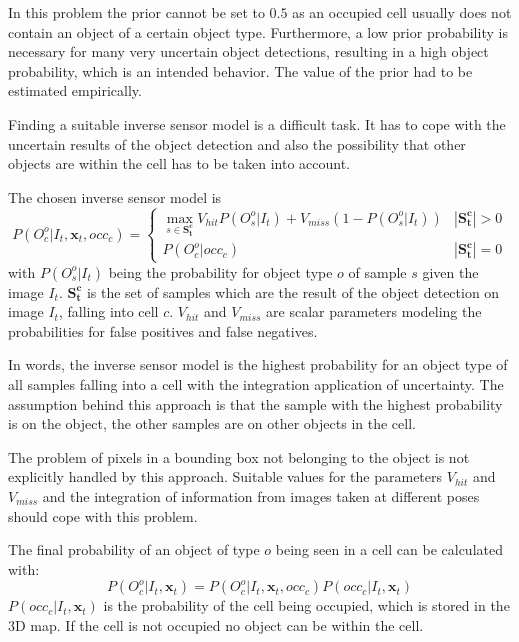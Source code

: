 In this problem the prior cannot be set to $0.5$ as an occupied cell usually does not contain an object of a certain object type. Furthermore, a low prior probability is necessary for many very uncertain object detections, resulting in a high object probability, which is an intended behavior. The value of the prior had to be estimated empirically.

Finding a suitable inverse sensor model is a difficult task. It has to cope with the uncertain results of the object detection and also the possibility that other objects are within the cell has to be taken into account.

The chosen inverse sensor model is
\begin{equation}
 P(O_{c}^{o}|I_{t}, \mathbf{x}_{t},occ_{c})=\begin{cases}\max_{s \in \mathbf{S_t^c}} V_{hit}P(O_{s}^{o}|I_t)+V_{miss}(1-P(O_{s}^{o}|I_t)) & |\mathbf{S_t^{c}}| > 0 \\P(O_{c}^{o}|occ_{c}) & |\mathbf{S_t^c}| = 0 \end{cases}                                            
\end{equation} 
with $P(O_{s}^{o}|I_t)$ being the probability for object type $o$ of sample $s$ given the image $I_t$. $\mathbf{S_t^{c}}$ is the set of samples which are the result of the object detection on image $I_t$, falling into cell $c$. $V_{hit}$ and $V_{miss}$ are scalar parameters modeling the probabilities for false positives and false negatives. 

In words, the inverse sensor model is the highest probability for an object type of all samples falling into a cell with the integration application of uncertainty. The assumption behind this approach is that the sample with the highest probability is on the object, the other samples are on other objects in the cell.

The problem of pixels in a bounding box not belonging to the object is not explicitly handled by this approach. Suitable values for the parameters $V_{hit}$ and $V_{miss}$ and the integration of information from images taken at different poses should cope with this problem.

The final probability of an object of type $o$ being seen in a cell can be calculated with:
\begin{equation}
 P(O_{c}^{o}|I_{t}, \mathbf{x}_{t})=P(O_{c}^{o}|I_{t}, \mathbf{x}_{t},occ_{c})P(occ_{c}|I_{t}, \mathbf{x}_{t})                                            
\end{equation}
$P(occ_{c}|I_{t}, \mathbf{x}_{t})$ is the probability of the cell being occupied, which is stored in the 3D map. If the cell is not occupied no object can be within the cell.

